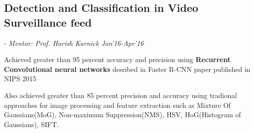 \documentclass[a4paper]{twentysecondcv} %
\begin{document}

\subsection{\textbf{Detection and Classification in Video Surveillance feed}}
\vspace{-2mm}
\hspace{1mm}- \textit{Mentor: Prof. Harish Karnick} \hfill \emph{Jan'16-Apr'16}
\vspace{1mm}
\begin{list3} \itemsep -0.5pt
\item Achieved greater than 95 percent accuracy and precision  using
  \textbf{Recurrent Convolutional neural networks} desribed in Faster R-CNN paper published in
  NIPS 2015
\item Also achieved greater than 85 percent precision and accuracy using tradional
  approaches for image processing and
  feature extraction such as Mixture Of Gaussians(MoG), Non-maximum Suppression(NMS), HSV,
  HoG(Histogram of Gaussians), SIFT.
  \newline
  \newline
\end{list3}
\vspace{2mm}
\end{document}
